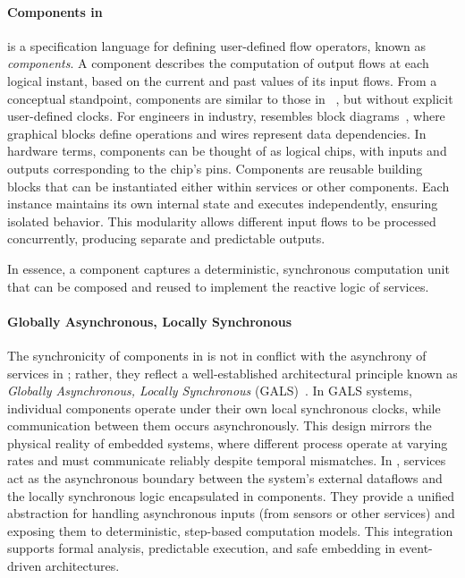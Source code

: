 \paragraph{Components in \GRSync}
\label{sec:intro:contrib:grust:grsync}

\GRSync is a specification language for defining user-defined flow operators, known as
\emph{components}. A component describes the computation of output flows at each logical instant,
based on the current and past values of its input flows.
%
From a conceptual standpoint, \GRSync components are similar to those in
\Lustre~\cite{DBLP:journals/pieee/HalbwachsCRP91}, but without explicit user-defined clocks. For
engineers in industry, \GRSync resembles \Simulink block diagrams~\cite{simulink},
where graphical blocks define operations and wires represent data dependencies. In hardware terms,
components can be thought of as logical chips, with inputs and outputs corresponding to the chip's
pins.
%
Components are reusable building blocks that can be instantiated either within services or other
components. Each instance maintains its own internal state and executes independently, ensuring
isolated behavior. This modularity allows different input flows to be processed concurrently,
producing separate and predictable outputs.

In essence, a \GRSync component captures a deterministic, synchronous computation unit that can be
composed and reused to implement the reactive logic of \GRFRP services.

\paragraph{Globally Asynchronous, Locally Synchronous}
\label{sec:intro:contrib:grust:gals}

The synchronicity of components in \GRSync is not in conflict with the asynchrony of services in
\GRFRP; rather, they reflect a well-established architectural principle known as \emph{Globally
    Asynchronous, Locally Synchronous} (GALS)~\cite{DBLP:phd/us/Chapiro85}. In GALS systems,
individual components operate under their own local synchronous clocks, while communication between
them occurs asynchronously. This design mirrors the physical reality of embedded systems, where
different process operate at varying rates and must communicate reliably despite temporal
mismatches.
%
In \GRust, services act as the asynchronous boundary between the system's external dataflows and the
locally synchronous logic encapsulated in components. They provide a unified abstraction for
handling asynchronous inputs (\eg from sensors or other services) and exposing them to
deterministic, step-based computation models. This integration supports formal analysis, predictable
execution, and safe embedding in event-driven architectures.

